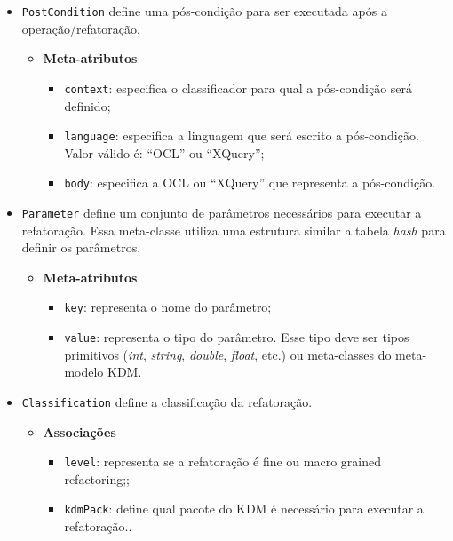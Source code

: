 \begin{itemize}
\item \texttt{PostCondition} define uma pós-condição para ser executada após a operação/refatoração.

\begin{itemize}
	\item \textbf{Meta-atributos}
		\begin{itemize}
			\item \texttt{context}: especifica o classificador para qual a pós-condição será definido;
			\item \texttt{language}: especifica a linguagem que será escrito a pós-condição. Valor válido é: ``OCL'' ou ``XQuery'';
			\item \texttt{body}: especifica a OCL ou ``XQuery'' que representa a pós-condição.
		\end{itemize}	
\end{itemize} 

\item \texttt{Parameter} define um conjunto de parâmetros necessários para executar a refatoração. Essa meta-classe utiliza uma estrutura similar a tabela \textit{hash} para definir os parâmetros.

\begin{itemize}
	\item \textbf{Meta-atributos}
		\begin{itemize}
			\item \texttt{key}: representa o nome do parâmetro;
			\item \texttt{value}: representa o tipo do parâmetro. Esse tipo deve ser tipos primitivos (\textit{int}, \textit{string}, \textit{double}, \textit{float}, etc.) ou meta-classes do meta-modelo KDM.
		\end{itemize}	
\end{itemize} 

\item \texttt{Classification} define a classificação da refatoração.

\begin{itemize}
	\item \textbf{Associações}
		\begin{itemize}
			\item \texttt{level}: representa se a refatoração é fine ou macro grained refactoring;;
			\item \texttt{kdmPack}: define qual pacote do KDM é necessário para executar a refatoração..
		\end{itemize}	
\end{itemize} 


\end{itemize}

